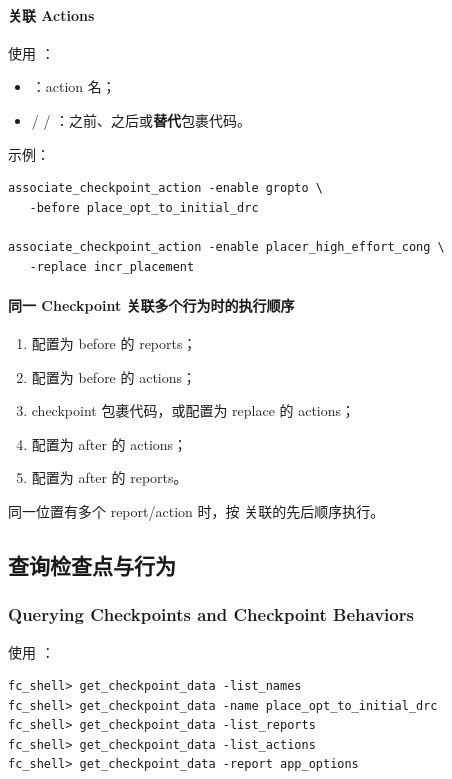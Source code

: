 \paragraph{关联 Actions}
使用 ：
\begin{itemize}
  \item {}：action 名；
  \item {} /  / ：之前、之后或\textbf{替代}包裹代码。
\end{itemize}

示例：
\begin{lstlisting}
associate_checkpoint_action -enable gropto \
   -before place_opt_to_initial_drc

associate_checkpoint_action -enable placer_high_effort_cong \
   -replace incr_placement
\end{lstlisting}

\paragraph{同一 Checkpoint 关联多个行为时的执行顺序}
\begin{enumerate}
  \item 配置为 before 的 reports；
  \item 配置为 before 的 actions；
  \item checkpoint 包裹代码，或配置为 replace 的 actions；
  \item 配置为 after 的 actions；
  \item 配置为 after 的 reports。
\end{enumerate}
同一位置有多个 report/action 时，按  关联的先后顺序执行。

\subsection{查询检查点与行为}
\subsubsection*{Querying Checkpoints and Checkpoint Behaviors}

使用 ：
\begin{lstlisting}
fc_shell> get_checkpoint_data -list_names
fc_shell> get_checkpoint_data -name place_opt_to_initial_drc
fc_shell> get_checkpoint_data -list_reports
fc_shell> get_checkpoint_data -list_actions
fc_shell> get_checkpoint_data -report app_options
\end{lstlisting}

